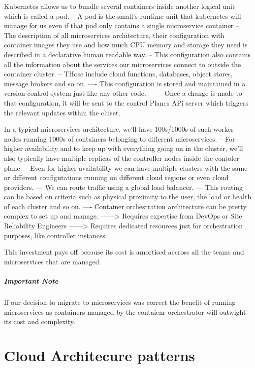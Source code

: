 \documentclass[a4paper, 11pt]{book}
\begin{document}
    Kubernetes allows us to bundle several containers inside another logical unit which is called a pod.
    -- A pod is the small's runtime unit that kubernetes will manage for us even if that pod only contains a single microservice container
    -- The description of all microservices architecture, their configuration with container images they use and how much CPU memory and storage they need is described in a declarative human readable way.
    -- This configuration also contains all the information about the services our microservices connect to outside the container cluster.
    -- THose include cloud functions, databases, object stores, message brokers and so on.
    ---- This configuration is stored and maintained in a version control system just like any other code.
    ------ Once a change is made to that configuration, it will be sent to the control Planes APi server which triggers the relevant updates within the cluset.

    In a typical microservices architecture, we'll have 100s/1000s of such worker nodes running 1000s of containers belonging to different microservices.
    -- For higher availability and to keep up with everything going on in the cluster, we'll also typically have multiple replicas of the controller nodes inside the contoler plane.
    -- Even for higher availability we can have multiple clusters with the same or different configutations running on different cloud regions or even cloud providers.
    --- We can route traffic using a global load balancer.
    --- This routing can be based on criteria such as physical proximity to the user, the load or health of each cluster and so on.
    ---- Container orchestration architecture can be pretty complex to set up and manage.
    ------> Requires expertise from DevOps or Site Reliability Engineers
    ------> Requires dedicated resources just for orchestration purposes, like controller instances.

    This investment pays off because its cost is amortised accross all the teams and microservices that are managed.

    \paragraph{Important Note}
    If our decision to migrate to microservices was correct the benefit of running microservices as containers managed by the contaienr orchestrator will outwight its cost and complexity.


    \chapter{Cloud Architecure patterns}
\end{document}
